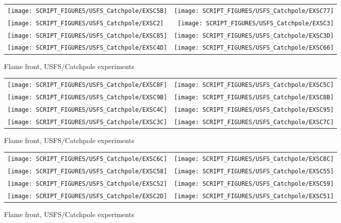 \begin{figure}[p]
\begin{tabular*}{\textwidth}{l@{\extracolsep{\fill}}r}
\texttt{[image: SCRIPT\_FIGURES/USFS\_Catchpole/EXSC5B]} &
\texttt{[image: SCRIPT\_FIGURES/USFS\_Catchpole/EXSC77]} \\
\texttt{[image: SCRIPT\_FIGURES/USFS\_Catchpole/EXSC2]} &
\texttt{[image: SCRIPT\_FIGURES/USFS\_Catchpole/EXSC3]} \\
\texttt{[image: SCRIPT\_FIGURES/USFS\_Catchpole/EXSC85]} &
\texttt{[image: SCRIPT\_FIGURES/USFS\_Catchpole/EXSC3D]} \\
\texttt{[image: SCRIPT\_FIGURES/USFS\_Catchpole/EXSC4D]} &
\texttt{[image: SCRIPT\_FIGURES/USFS\_Catchpole/EXSC66]} \\
\end{tabular*}
\caption[Flame front, USFS/Catchpole experiments]{Flame front, USFS/Catchpole experiments}
\label{USFS_Catchpole_064}
\end{figure}

\begin{figure}[p]
\begin{tabular*}{\textwidth}{l@{\extracolsep{\fill}}r}
\texttt{[image: SCRIPT\_FIGURES/USFS\_Catchpole/EXSC8F]} &
\texttt{[image: SCRIPT\_FIGURES/USFS\_Catchpole/EXSC5C]} \\
\texttt{[image: SCRIPT\_FIGURES/USFS\_Catchpole/EXSC9B]} &
\texttt{[image: SCRIPT\_FIGURES/USFS\_Catchpole/EXSC8B]} \\
\texttt{[image: SCRIPT\_FIGURES/USFS\_Catchpole/EXSC4C]} &
\texttt{[image: SCRIPT\_FIGURES/USFS\_Catchpole/EXSC95]} \\
\texttt{[image: SCRIPT\_FIGURES/USFS\_Catchpole/EXSC3C]} &
\texttt{[image: SCRIPT\_FIGURES/USFS\_Catchpole/EXSC7C]} \\
\end{tabular*}
\caption[Flame front, USFS/Catchpole experiments]{Flame front, USFS/Catchpole experiments}
\label{USFS_Catchpole_072}
\end{figure}

\begin{figure}[p]
\begin{tabular*}{\textwidth}{l@{\extracolsep{\fill}}r}
\texttt{[image: SCRIPT\_FIGURES/USFS\_Catchpole/EXSC6C]} &
\texttt{[image: SCRIPT\_FIGURES/USFS\_Catchpole/EXSC8C]} \\
\texttt{[image: SCRIPT\_FIGURES/USFS\_Catchpole/EXSC58]} &
\texttt{[image: SCRIPT\_FIGURES/USFS\_Catchpole/EXSC55]} \\
\texttt{[image: SCRIPT\_FIGURES/USFS\_Catchpole/EXSC52]} &
\texttt{[image: SCRIPT\_FIGURES/USFS\_Catchpole/EXSC59]} \\
\texttt{[image: SCRIPT\_FIGURES/USFS\_Catchpole/EXSC2D]} &
\texttt{[image: SCRIPT\_FIGURES/USFS\_Catchpole/EXSC51]} \\
\end{tabular*}
\caption[Flame front, USFS/Catchpole experiments]{Flame front, USFS/Catchpole experiments}
\label{USFS_Catchpole_080}
\end{figure}

